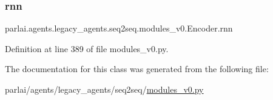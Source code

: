 \subsubsection{\texorpdfstring{rnn}{rnn}}
{\footnotesize\ttfamily parlai.\+agents.\+legacy\+\_\+agents.\+seq2seq.\+modules\+\_\+v0.\+Encoder.\+rnn}



Definition at line 389 of file modules\+\_\+v0.\+py.



The documentation for this class was generated from the following file\+:\begin{DoxyCompactItemize}
\item 
parlai/agents/legacy\+\_\+agents/seq2seq/\hyperlink{seq2seq_2modules__v0_8py}{modules\+\_\+v0.\+py}\end{DoxyCompactItemize}
